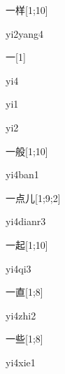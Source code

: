 \begin{verbete}[yi2yang4]{一样}[1;10]
\begin{pronuncia}{yi2yang4}
\end{pronuncia}
\end{verbete}

\begin{verbete}[yi4]{一}[1]
\begin{pronuncia}{yi4}
\end{pronuncia}
\begin{pronuncia}{yi1}
\end{pronuncia}
\begin{pronuncia}{yi2}
\end{pronuncia}
\end{verbete}

\begin{verbete}[yi4ban1]{一般}[1;10]
\begin{pronuncia}{yi4ban1}
\end{pronuncia}
\end{verbete}

\begin{verbete}[yi4dianr3]{一点儿}[1;9;2]
\begin{pronuncia}{yi4dianr3}
\end{pronuncia}
\end{verbete}

\begin{verbete}[yi4qi3]{一起}[1;10]
\begin{pronuncia}{yi4qi3}
\end{pronuncia}
\end{verbete}

\begin{verbete}[yi4zhi2]{一直}[1;8]
\begin{pronuncia}{yi4zhi2}
\end{pronuncia}
\end{verbete}

\begin{verbete}[yi4xie1]{一些}[1;8]
\begin{pronuncia}{yi4xie1}
\end{pronuncia}
\end{verbete}

